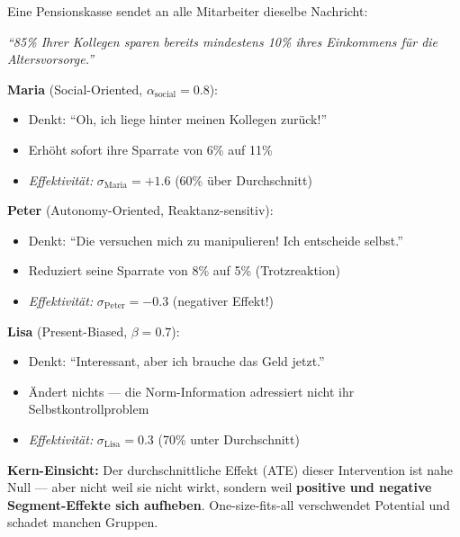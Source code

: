 \begin{tcolorbox}[colback=yellow!5!white, colframe=yellow!75!black,
    title=Intuition: Maria, Peter und Lisa --- Drei Reaktionen auf dieselbe Intervention]

Eine Pensionskasse sendet an alle Mitarbeiter dieselbe Nachricht:

\begin{center}
\textit{``85\% Ihrer Kollegen sparen bereits mindestens 10\% ihres Einkommens für die Altersvorsorge.''}
\end{center}

\textbf{Maria} (Social-Oriented, $\alpha_{\text{social}} = 0.8$):
\begin{itemize}[nosep]
\item Denkt: ``Oh, ich liege hinter meinen Kollegen zurück!''
\item Erhöht sofort ihre Sparrate von 6\% auf 11\%
\item \textit{Effektivität:} $\sigma_{\text{Maria}} = +1.6$ (60\% über Durchschnitt)
\end{itemize}

\textbf{Peter} (Autonomy-Oriented, Reaktanz-sensitiv):
\begin{itemize}[nosep]
\item Denkt: ``Die versuchen mich zu manipulieren! Ich entscheide selbst.''
\item Reduziert seine Sparrate von 8\% auf 5\% (Trotzreaktion)
\item \textit{Effektivität:} $\sigma_{\text{Peter}} = -0.3$ (negativer Effekt!)
\end{itemize}

\textbf{Lisa} (Present-Biased, $\beta = 0.7$):
\begin{itemize}[nosep]
\item Denkt: ``Interessant, aber ich brauche das Geld jetzt.''
\item Ändert nichts --- die Norm-Information adressiert nicht ihr Selbstkontrollproblem
\item \textit{Effektivität:} $\sigma_{\text{Lisa}} = 0.3$ (70\% unter Durchschnitt)
\end{itemize}

\textbf{Kern-Einsicht:} Der durchschnittliche Effekt (ATE) dieser Intervention ist nahe Null --- aber nicht weil sie nicht wirkt, sondern weil \textbf{positive und negative Segment-Effekte sich aufheben}. One-size-fits-all verschwendet Potential und schadet manchen Gruppen.
\end{tcolorbox}

